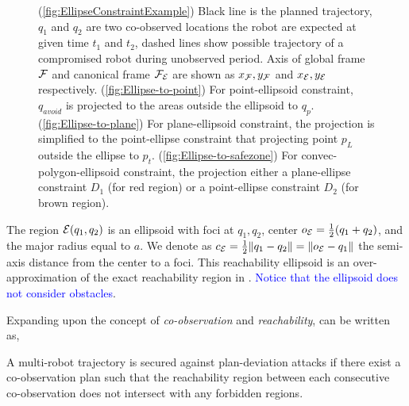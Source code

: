 \documentclass[10pt,twocolumn,twoside]{IEEEtran}
\newcommand{\new}[1]{\textcolor{blue}{#1}}
\newcommand{\news}{\color{blue}}
\begin{document}
\begin{figure}
    \caption{\news (\ref{fig:EllipseConstraintExample}) Black line is the planned trajectory, $q_1$ and $q_2$ are two co-observed locations the robot are expected at given time $t_1$ and $t_2$, dashed lines show possible trajectory of a compromised robot during unobserved period. Axis of global frame $\mathcal{F}$ and canonical frame $\mathcal{F}_{\mathcal{E}}$ are shown as $x_{\mathcal{F}}, y_{\mathcal{F}}$ and $x_{\mathcal{E}}, y_{\mathcal{E}}$ respectively. 
    (\ref{fig:Ellipse-to-point}) For point-ellipsoid constraint, $q_{avoid}$ is projected to the areas outside the ellipsoid to $q_{p}$. 
    (\ref{fig:Ellipse-to-plane}) For plane-ellipsoid constraint, the projection is simplified to the point-ellipse constraint that projecting point $p_{L}$ outside the ellipse to $p_{t}$.
    (\ref{fig:Ellipse-to-safezone}) For convec-polygon-ellipsoid constraint, the projection either a plane-ellipse constraint $D_{1}$ (for red region) or a point-ellipse constraint $D_{2}$ (for brown region).}
    \label{fig:Reachability_full}
  \end{figure}

The region $\mathcal{E}(q_1,q_2)$ is an ellipsoid with foci at $q_1,q_2$, center $o_{\mathcal{E}} = \frac{1}{2}(q_1+q_2)$, and the major radius equal to $a$. We denote as $c_{\mathcal{E}}=\frac{1}{2}\lVert q_1-q_2\rVert=\lVert o_{\mathcal{E}}-q_1\rVert$ the semi-axis distance from the center to a foci. This reachability ellipsoid is an over-approximation of the exact reachability region in . \new{Notice that the ellipsoid does not consider obstacles}.

Expanding upon the concept of \emph{co-observation} and \emph{reachability},  can be written as,
\begin{remark}\label{rmk:revised-security}
  A multi-robot trajectory is secured against plan-deviation attacks if there exist a co-observation plan such that the reachability region between each consecutive co-observation does not intersect with any forbidden regions.
\end{remark}
\end{document}
